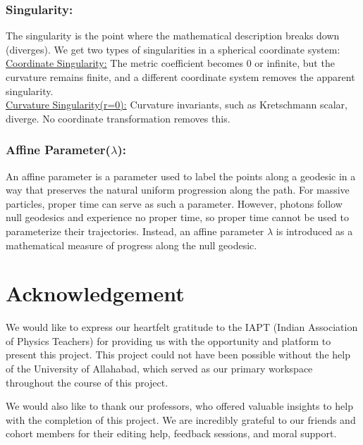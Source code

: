 \documentclass[12pt]{article}
\begin{document}
\begin{itemize}
\subsubsection{\textbf{Singularity:}} The singularity is the point where the mathematical description breaks down (diverges).
We get two types of singularities in a spherical coordinate system:
\\
\underline{Coordinate Singularity:} The metric coefficient becomes 0 or infinite, but the curvature remains finite, and a different coordinate system removes the apparent singularity. 
\\
\underline{Curvature Singularity(r=0):} Curvature invariants, such as Kretschmann scalar, diverge. No coordinate transformation removes this.

\subsubsection{Affine Parameter($\lambda$):} An affine parameter is a parameter used to label the points along a geodesic in a way that preserves the natural uniform progression along the path. For massive particles, proper time can serve as such a parameter. However, photons follow null geodesics and experience no proper time, so proper time cannot be used to parameterize their trajectories. Instead, an affine parameter $\lambda$ is introduced as a mathematical measure of progress along the null geodesic.




\newpage\section{Acknowledgement}
We would like to express our heartfelt gratitude to the IAPT (Indian Association of Physics Teachers) for providing us with the opportunity and platform to present this project. This project could not have been possible without the help of the University of Allahabad, which served as our primary workspace throughout the course of this project. 

We would also like to thank our professors, who offered valuable insights to help with the completion of this project. 
We are incredibly grateful to our friends and cohort members for their editing help, feedback sessions, and moral support. 


\end{itemize}
\end{document}
